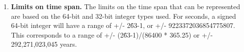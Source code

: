 
\begin{enumerate}

\item {\bf Limits on time span.} The limits on the time span that can be represented are 
based on the
64-bit and 32-bit integer types used.  For seconds, a signed 64-bit integer
will have a range of +/- 2\^63-1, or +/- 9223372036854775807.  This corresponds
to a range of +/- (2\^63-1)/(86400 * 365.25) or +/- 292,271,023,045 years.

\end{enumerate}



